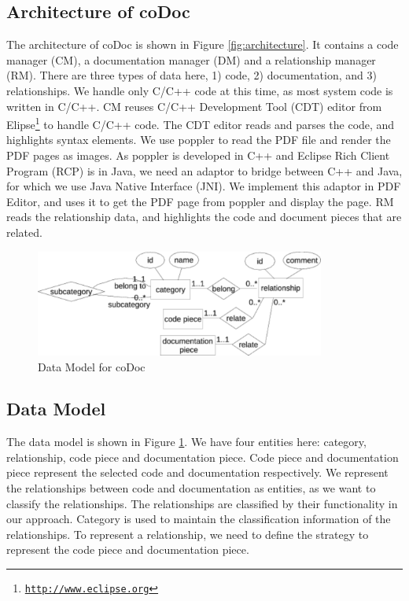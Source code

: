 \documentclass[runningheads,a4paper]{llncs}
\begin{document}
\subsection{Architecture of coDoc}
The architecture of coDoc is shown in Figure \ref{fig:architecture}. 
It contains a code manager (CM), a documentation manager (DM) and a relationship manager (RM).
There are three types of data here, 1) code, 2) documentation, and 3) relationships.
We handle only C/C++ code at this time, 
as most system code is written in C/C++.
CM reuses C/C++ Development Tool (CDT) editor from Elipse\footnote{\texttt{\url{http://www.eclipse.org}}} to handle C/C++ code.
The CDT editor reads and parses the code, 
and highlights syntax elements.
We use poppler to read the PDF file and render the PDF pages as images.
As poppler is developed in C++ and Eclipse Rich Client Program (RCP) is in Java,
we need an adaptor to bridge between C++ and Java,
for which we use Java Native Interface (JNI).
We implement this adaptor in PDF Editor, 
and uses it to get the PDF page from poppler and display the page.
RM reads the relationship data,
and highlights the code and document pieces that are related.


\begin{figure}
\begin{center}
\includegraphics[width=0.85\textwidth]{datamodel}
\caption{Data Model for coDoc}
\label{fig:datamodel}
\end{center}
\end{figure}

\subsection{Data Model}
The data model is shown in Figure \ref{fig:datamodel}.
We have four entities here: category, relationship, code piece and documentation piece.
Code piece and documentation piece represent the selected code and documentation respectively.
We represent the relationships between code and documentation as entities,
as we want to classify the relationships.
The relationships are classified by their functionality in our approach.
Category is used to maintain the classification information of the relationships.
To represent a relationship, 
we need to define the strategy to represent the code piece and documentation piece.
\end{document}

